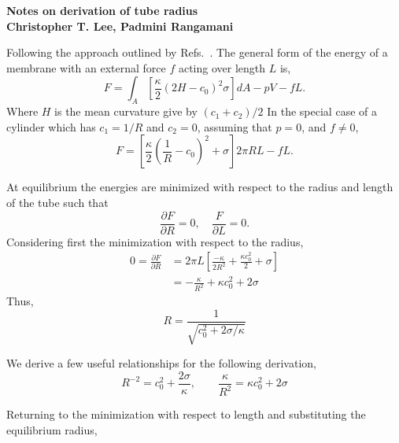 \documentclass[11pt]{article}
\begin{document}
\begin{centering}
    \textbf{\Large Notes on derivation of tube radius}\\[3mm]
    \textbf{Christopher T. Lee, Padmini Rangamani}\\[1mm]
\end{centering}

Following the approach outlined by Refs.~\cite{DerenyiEtAl2002,ShurerEtAl2019}.
The general form of the energy of a membrane with an external force \(f\) acting over length \(L\) is,
\begin{equation}
    F = \int_A \left[\frac{\kappa}{2}(2H - c_0)^2 \sigma \right]dA - pV - fL.
\end{equation}
Where \(H\) is the mean curvature give by \((c_1 + c_2)/2\)
In the special case of a cylinder which has \(c_1 = 1/R\) and \(c_2 = 0\), assuming that \(p=0\), and \(f\neq 0\),
\begin{equation}
    F = \left[ \frac{\kappa}{2} \left(\frac{1}{R} - c_0\right)^2 + \sigma\right] 2\pi RL - fL.
\end{equation}

At equilibrium the energies are minimized with respect to the radius and length of the tube such that
\begin{equation}
    \frac{\partial F}{\partial R} = 0,\quad \frac{F}{\partial L} =0.
\end{equation}
Considering first the minimization with respect to the radius,
\begin{align*}
    0 = \frac{\partial F}{\partial R} & = 2\pi L\left[\frac{-\kappa}{2R^2} + \frac{\kappa c_0^2}{2} + \sigma\right] \\
                                      & = - \frac{\kappa}{R^2} + \kappa c_0^2 + 2\sigma
\end{align*}
Thus,
\begin{equation}
    \boxed{R = \frac{1}{\sqrt{c_0^2 + 2\sigma/\kappa}}}
\end{equation}

We derive a few useful relationships for the following derivation,
\begin{equation}
    R^{-2} = c_0^2 + \frac{2\sigma}{\kappa}, \qquad \frac{\kappa}{R^2} = \kappa c_0^2 + 2\sigma
\end{equation}

Returning to the minimization with respect to length and substituting the equilibrium radius,
\end{document}
